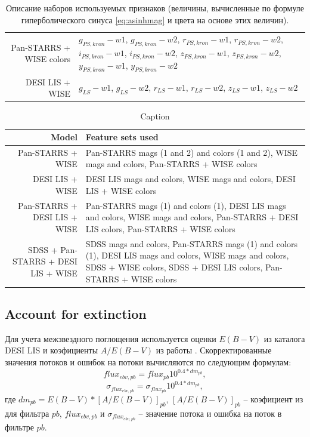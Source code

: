\documentclass[fleqn,usenatbib]{mnras}
\begin{document}
\begin{table}
\begin{tabular}{ r p{10cm} }
        Pan-STARRS + WISE colors & \(g_{PS,kron}-w1\), \(g_{PS,kron}-w2\), \(r_{PS,kron}-w1\), \(r_{PS,kron}-w2\), \(i_{PS,kron}-w1\), \(i_{PS,kron}-w2\), \(z_{PS,kron}-w1\), \(z_{PS,kron}-w2\), \(y_{PS,kron}-w1\), \(y_{PS,kron}-w2\) \\
        DESI LIS + WISE & \(g_{LS}-w1\), \(g_{LS}-w2\), \(r_{LS}-w1\), \(r_{LS}-w2\), \(z_{LS}-w1\), \(z_{LS}-w2\) \\
    \hline
    \end{tabular}
    \label{tab:featuressets}
    \caption{Описание наборов используемых признаков (величины, вычисленные по формуле гиперболического синуса \eqref{eq:asinhmag} и цвета на основе этих величин).}
\end{table}

\begin{table}[ht]
    \centering
    \begin{tabular}{r p{10cm}}
    \hline
        Model & Feature sets used \\
    \hline
        Pan-STARRS + WISE & Pan-STARRS mags (1 and 2) and colors (1 and 2), WISE mags and colors, Pan-STARRS + WISE colors \\
        DESI LIS + WISE & DESI LIS mags and colors, WISE mags and colors, DESI LIS + WISE colors \\
        Pan-STARRS + DESI LIS + WISE & Pan-STARRS mags (1) and colors (1), DESI LIS mags and colors, WISE mags and colors, Pan-STARRS + DESI LIS colors, Pan-STARRS + WISE colors \\
        SDSS + Pan-STARRS + DESI LIS + WISE & SDSS mags and colors, Pan-STARRS mags (1) and colors (1), DESI LIS mags and colors, WISE mags and colors, SDSS + WISE colors, SDSS + DESI LIS colors, Pan-STARRS + WISE colors \\
    \hline
    \end{tabular}
    \caption{Caption}
    \label{tab:models}
\end{table}


\subsection{Account for extinction}

Для учета межзвездного поглощения используется оценки $E(B-V)$ из каталога DESI LIS и коэфициенты $A/E(B-V)$ из работы \citep{2011ApJ...737..103S}. Скорректированные значения потоков и ошибок на потоки вычисляются по следующим формулам:
\begin{equation}
    flux_{ebv, pb} = flux_{pb} 10^{0.4 * dm_{pb}},
\end{equation}
\begin{equation}
    \sigma_{flux_{ebv, pb}} = \sigma_{flux_{pb}} 10^{0.4 * dm_{pb}},
\end{equation}
где $dm_{pb} = E(B-V) * [A/E(B-V)]_{pb}$, $[A/E(B-V)]_{pb}$ -- коэфициент из \citep{2011ApJ...737..103S} для фильтра $pb$, $flux_{ebv, pb}$ и $\sigma_{flux_{ebv, pb}}$ -- значение потока и ошибка на поток в фильтре $pb$.
\end{document}
